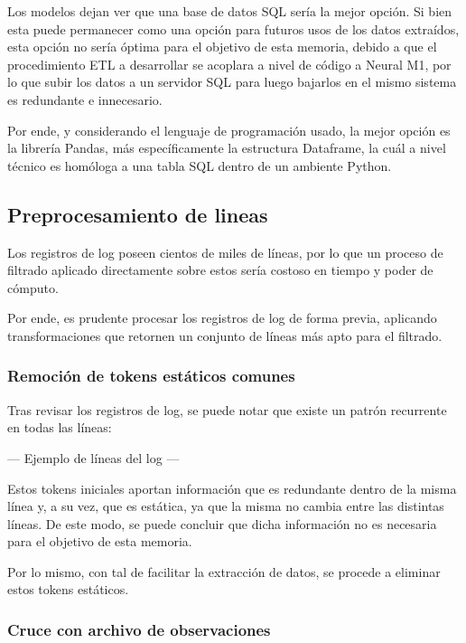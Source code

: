 Los modelos dejan ver que una base de datos SQL sería la mejor opción. Si bien esta puede permanecer como una opción para futuros usos de los datos extraídos, esta opción no sería óptima para el objetivo de esta memoria, debido a que el procedimiento ETL a desarrollar se acoplara a nivel de código a Neural M1, por lo que subir los datos a un servidor SQL para luego bajarlos en el mismo sistema es redundante e innecesario.

Por ende, y considerando el lenguaje de programación usado, la mejor opción es la librería Pandas, más específicamente la estructura Dataframe, la cuál a nivel técnico es homóloga a una tabla SQL dentro de un ambiente Python.

\subsection{Preprocesamiento de lineas}

Los registros de log poseen cientos de miles de líneas, por lo que un proceso de filtrado aplicado directamente sobre estos sería costoso en tiempo y poder de cómputo.

Por ende, es prudente procesar los registros de log de forma previa, aplicando transformaciones que retornen un conjunto de líneas más apto para el filtrado.

\subsubsection{Remoción de tokens estáticos comunes}

Tras revisar los registros de log, se puede notar que existe un patrón recurrente en todas las líneas:

--- Ejemplo de líneas del log ---

Estos tokens iniciales aportan información que es redundante dentro de la misma línea y, a su vez, que es estática, ya que la misma no cambia entre las distintas líneas. De este modo, se puede concluir que dicha información no es necesaria para el objetivo de esta memoria.

Por lo mismo, con tal de facilitar la extracción de datos, se procede a eliminar estos tokens estáticos.

\subsubsection{Cruce con archivo de observaciones}

